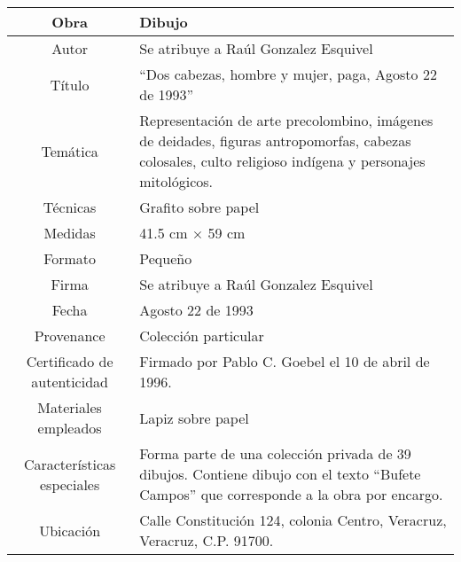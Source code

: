 \begin{table}[H]
\centering
\begin{tabular}{|c|m{}|}
\hline
Obra& Dibujo	\\
\hline
Autor & Se atribuye a Ra\'ul Gonzalez Esquivel\\
\hline
T\'itulo & ``Dos cabezas, hombre y mujer, paga, Agosto 22 de 1993''\\
\hline
Tem\'atica & Representaci\'on de arte precolombino, im\'agenes de deidades, figuras antropomorfas, cabezas colosales, culto religioso ind\'igena y personajes mitol\'ogicos.\\
\hline
T\'ecnicas &Grafito sobre papel \\
\hline
Medidas & 41.5 cm $\times$ 59 cm \\
\hline
 Formato & Peque\~no \\
 \hline
 Firma & Se atribuye a Ra\'ul Gonzalez Esquivel\\ 
 \hline
  Fecha & Agosto 22 de 1993\\
 \hline
 Provenance & Colecci\'on particular\\
 \hline
 Certificado de autenticidad& Firmado por Pablo C. Goebel el 10 de abril de 1996.  \\
 \hline 
  Materiales empleados & Lapiz sobre papel\\
 \hline
 Caracter\'isticas especiales & Forma parte de una colecci\'on privada de 39 dibujos. 
Contiene dibujo con el texto ``Bufete Campos'' que corresponde a la obra por encargo. \\
\hline 
Ubicaci\'on & Calle Constituci\'on 124, colonia Centro, Veracruz, Veracruz, C.P. 91700.\\
\hline

\end{tabular}
\end{table}

